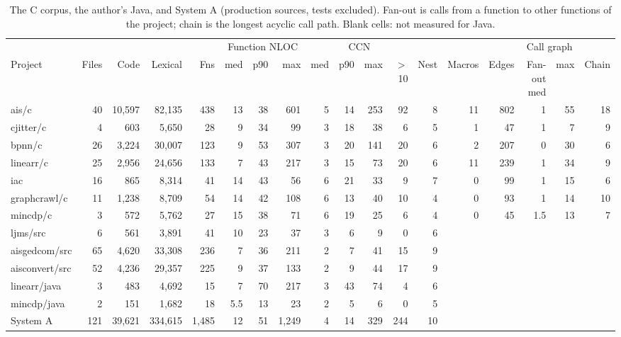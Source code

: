 \documentclass[11pt,a4paper]{article}
\begin{document}
\begin{table}[H]
\centering
\scriptsize
\setlength{\tabcolsep}{2.4pt}
\begin{tabular}{lrrrrrrrrrrrrrrrrr}
\toprule
& & & & & \multicolumn{3}{c}{Function NLOC} & \multicolumn{4}{c}{CCN} & & & \multicolumn{4}{c}{Call graph} \\
\cmidrule(lr){6-8} \cmidrule(lr){9-12} \cmidrule(lr){15-18}
Project & Files & Code & Lexical & Fns & med & p90 & max & med & p90 & max & $>$10 & Nest & Macros & Edges & Fan-out med & max & Chain \\
\midrule
ais/c & 40 & 10,597 & 82,135 & 438 & 13 & 38 & 601 & 5 & 14 & 253 & 92 & 8 & 11 & 802 & 1 & 55 & 18 \\
cjitter/c & 4 & 603 & 5,650 & 28 & 9 & 34 & 99 & 3 & 18 & 38 & 6 & 5 & 1 & 47 & 1 & 7 & 9 \\
bpnn/c & 26 & 3,224 & 30,007 & 123 & 9 & 53 & 307 & 3 & 20 & 141 & 20 & 6 & 2 & 207 & 0 & 30 & 6 \\
linearr/c & 25 & 2,956 & 24,656 & 133 & 7 & 43 & 217 & 3 & 15 & 73 & 20 & 6 & 11 & 239 & 1 & 34 & 9 \\
iac & 16 & 865 & 8,314 & 41 & 14 & 43 & 56 & 6 & 21 & 33 & 9 & 7 & 0 & 99 & 1 & 15 & 6 \\
graphcrawl/c & 11 & 1,238 & 8,709 & 54 & 14 & 42 & 108 & 6 & 13 & 40 & 10 & 4 & 0 & 93 & 1 & 14 & 10 \\
mincdp/c & 3 & 572 & 5,762 & 27 & 15 & 38 & 71 & 6 & 19 & 25 & 6 & 4 & 0 & 45 & 1.5 & 13 & 7 \\
\addlinespace
ljms/src & 6 & 561 & 3,891 & 41 & 10 & 23 & 37 & 3 & 6 & 9 & 0 & 6 & & & & & \\
aisgedcom/src & 65 & 4,620 & 33,308 & 236 & 7 & 36 & 211 & 2 & 7 & 41 & 15 & 9 & & & & & \\
aisconvert/src & 52 & 4,236 & 29,357 & 225 & 9 & 37 & 133 & 2 & 9 & 44 & 17 & 9 & & & & & \\
linearr/java & 3 & 483 & 4,692 & 15 & 7 & 70 & 217 & 3 & 43 & 74 & 4 & 6 & & & & & \\
mincdp/java & 2 & 151 & 1,682 & 18 & 5.5 & 13 & 23 & 2 & 5 & 6 & 0 & 5 & & & & & \\
\addlinespace
System A & 121 & 39,621 & 334,615 & 1,485 & 12 & 51 & 1,249 & 4 & 14 & 329 & 244 & 10 & & & & & \\
\bottomrule
\end{tabular}
\caption{The C corpus, the author's Java, and System A (production sources, tests excluded). Fan-out is calls from a function to other functions of the project; chain is the longest acyclic call path. Blank cells: not measured for Java.}
\label{tab:corpus}
\end{table}
\end{document}
